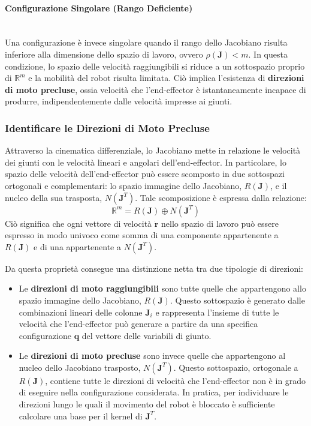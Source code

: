 \documentclass[11pt, a4paper]{report}
\begin{document}
\paragraph{Configurazione Singolare (Rango Deficiente)}\mbox{}\\
Una configurazione è invece singolare quando il rango dello Jacobiano risulta inferiore alla dimensione dello spazio di lavoro, ovvero $\rho(\bm{J}) < m$. In questa condizione, lo spazio delle velocità raggiungibili si riduce a un sottospazio proprio di $\mathbb{R}^m$ e la mobilità del robot risulta limitata. Ciò implica l'esistenza di \textbf{direzioni di moto precluse}, ossia velocità che l'end-effector è istantaneamente incapace di produrre, indipendentemente dalle velocità impresse ai giunti.

\subsubsection{Identificare le Direzioni di Moto Precluse}
Attraverso la cinematica differenziale, lo Jacobiano mette in relazione le velocità dei giunti con le velocità lineari e angolari dell'end-effector. In particolare, lo spazio delle velocità dell'end-effector può essere scomposto in due sottospazi ortogonali e complementari: lo spazio immagine dello Jacobiano, $R(\bm{J})$, e il nucleo della sua trasposta, $N(\bm{J}^T)$. Tale scomposizione è espressa dalla relazione:
\[
    \mathbb{R}^m = R(\bm{J}) \oplus N(\bm{J}^T)
\]
Ciò significa che ogni vettore di velocità $\dot{\bm{r}}$ nello spazio di lavoro può essere espresso in modo univoco come somma di una componente appartenente a $R(\bm{J})$ e di una appartenente a $N(\bm{J}^T)$.

Da questa proprietà consegue una distinzione netta tra due tipologie di direzioni:
\begin{itemize}
    \item Le \textbf{direzioni di moto raggiungibili} sono tutte quelle che appartengono allo spazio immagine dello Jacobiano, $R(\bm{J})$. Questo sottospazio è generato dalle combinazioni lineari delle colonne $\bm{J}_{i}$ e rappresenta l'insieme di tutte le velocità che l'end-effector può generare a partire da una specifica configurazione \(\bm{q}\) del vettore delle variabili di giunto.
    \item Le \textbf{direzioni di moto precluse} sono invece quelle che appartengono al nucleo dello Jacobiano trasposto, $N(\bm{J}^T)$. Questo sottospazio, ortogonale a $R(\bm{J})$, contiene tutte le direzioni di velocità che l'end-effector non è in grado di eseguire nella configurazione considerata. In pratica, per individuare le direzioni lungo le quali il movimento del robot è bloccato è sufficiente calcolare una base per il kernel di $\bm{J}^T$.
\end{itemize}
\end{document}
